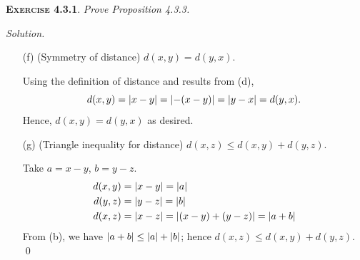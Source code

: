 \documentclass[12pt]{article}
\theoremstyle{remark}
\newenvironment{exer}[2]{
    \noindent \setlength{\parskip}{1em}%
    \textsc{\textbf{Exercise #1}}. \textit{#2} \par
    \noindent \textit{Solution.} %
}{\bigskip}
\begin{document}
\begin{exer}{4.3.1}{
    Prove Proposition 4.3.3.
}
\begin{enumerate}[topsep=0mm,label=(\alph*)]
            By definition of distance, $d(x, y) = \abs{x - y}$.
            From (a), $\abs{x - y} \ge 0$; it follows that $d(x, y) \ge 0$.

            From (a), $\abs{x - y} = 0$ if and only if $x - y = 0$.
            In other words, we have $d(x, y) = 0$ if and only if $x = y$, as required.

        \item[(f)] (Symmetry of distance)
            $d(x, y) = d(y, x)$.

            Using the definition of distance and results from (d),
            \[
                d(x, y) = \abs{x - y} = \abs{-(x - y)} = \abs{y - x} = d(y, x).
            \]
            Hence, $d(x, y) = d(y, x)$ as desired.

        \item[(g)] (Triangle inequality for distance)
            $d(x, z) \le d(x, y) + d(y, z)$.

            Take $a = x - y$, $b = y - z$.
            \begin{align*}
                d(x, y) &= \abs{x - y} = \abs{a} \\
                d(y, z) &= \abs{y - z} = \abs{b} \\
                d(x, z) &= \abs{x - z} = \abs{(x - y) + (y - z)} = \abs{a + b}
            \end{align*}
            From (b), we have $\abs{a + b} \le \abs{a} + \abs{b}$; hence $d(x, z) \le d(x, y) + d(y, z)$. \qed
    \end{enumerate}
\end{exer}
\end{document}
